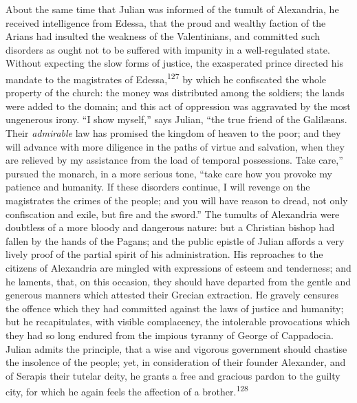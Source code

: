 
About the same time that Julian was informed of the tumult of
Alexandria, he received intelligence from Edessa, that the proud
and wealthy faction of the Arians had insulted the weakness of
the Valentinians, and committed such disorders as ought not to be
suffered with impunity in a well-regulated state. Without
expecting the slow forms of justice, the exasperated prince
directed his mandate to the magistrates of Edessa,\textsuperscript{127} by which
he confiscated the whole property of the church: the money was
distributed among the soldiers; the lands were added to the
domain; and this act of oppression was aggravated by the most
ungenerous irony. “I show myself,” says Julian, “the true friend
of the Galilæans. Their \textit{admirable} law has promised the kingdom
of heaven to the poor; and they will advance with more diligence
in the paths of virtue and salvation, when they are relieved by
my assistance from the load of temporal possessions. Take care,”
pursued the monarch, in a more serious tone, “take care how you
provoke my patience and humanity. If these disorders continue, I
will revenge on the magistrates the crimes of the people; and you
will have reason to dread, not only confiscation and exile, but
fire and the sword.” The tumults of Alexandria were doubtless of
a more bloody and dangerous nature: but a Christian bishop had
fallen by the hands of the Pagans; and the public epistle of
Julian affords a very lively proof of the partial spirit of his
administration. His reproaches to the citizens of Alexandria are
mingled with expressions of esteem and tenderness; and he
laments, that, on this occasion, they should have departed from
the gentle and generous manners which attested their Grecian
extraction. He gravely censures the offence which they had
committed against the laws of justice and humanity; but he
recapitulates, with visible complacency, the intolerable
provocations which they had so long endured from the impious
tyranny of George of Cappadocia. Julian admits the principle,
that a wise and vigorous government should chastise the insolence
of the people; yet, in consideration of their founder Alexander,
and of Serapis their tutelar deity, he grants a free and gracious
pardon to the guilty city, for which he again feels the affection
of a brother.\textsuperscript{128}

